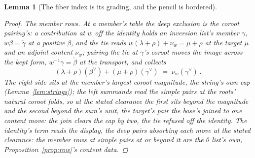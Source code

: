 \documentclass[11pt]{article}
\newtheorem{lemma}{Lemma}
\theoremstyle{definition}
\begin{document}
\begin{lemma}[The fiber index is its grading, and the pencil is
bordered]
\begin{proof}
\emph{The member rows.} At a member's table the deep exclusion
is the coroot pairing's: a contribution at $w$ off the identity
holds an
inversion list's member $\gamma$, $w\beta=\check\gamma$ at a positive
$\beta$, and the tie reads $w(\lambda+\rho)+\nu_w=\mu+\rho$ at
the target $\mu$ and an adjoint content $\nu_w$; pairing the tie
at $\gamma$'s coroot moves the image across the kept form,
$w^{-1}\gamma=\check\beta$ at the transport, and collects
\[
(\lambda+\rho)(\beta^\vee)+(\mu+\rho)(\gamma^\vee)
\;=\;\nu_w(\gamma^\vee)\ .
\]
The right side sits at the member's largest coroot magnitude, the
string's own cap (Lemma~\ref{lem:strings}); the left summands
read the simple pairs at the roots' natural coroot folds, so at
the stated clearance the first sits beyond the magnitude and the
second beyond the sum's unit, the target's pair the base's joined
to one content move: the join clears the cap by two, the tie
refused off the identity. The identity's
term reads the display, the deep pairs absorbing each move at
the stated clearance: the
member rows at simple pairs at or beyond it are the $\theta$
list's own, Proposition~\ref{prop:row}'s content data.
\end{proof}

\end{lemma}
\end{document}

